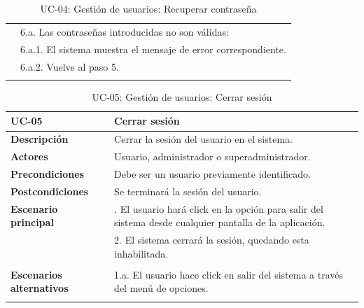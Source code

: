 \begin{table}
\begin{center}
\begin{tabularx}{16.4cm}{|l|X|}
      & 6.a. Las contraseñas introducidas no son válidas:\\
      & \hspace{0.3cm} 6.a.1. El sistema muestra el mensaje de error correspondiente.\\
      & \hspace{0.3cm} 6.a.2. Vuelve al paso 5.\\
      & \\
      \hline
    \end{tabularx}
    \caption{UC-04: Gestión de usuarios: Recuperar contraseña}
    \label{tab:CU-restablecer-contrasena}
  \end{center}
\end{table}


\begin{table}
  \begin{center}
    \begin{tabularx}{16.4cm}{|l|X|}
      \hline
      \textbf{UC-05} & \textbf{Cerrar sesión}\\
      \hline
      \textbf{Descripción} & Cerrar la sesión del usuario en el sistema.\\
      \hline
      \textbf{Actores} & Usuario, administrador o superadministrador.\\
      \hline
      \textbf{Precondiciones} & Debe ser un usuario previamente identificado.\\
      \hline
      \textbf{Postcondiciones} & Se terminará la sesión del usuario.\\
      \hline
      \textbf{Escenario principal} & \smallskip 1. El usuario hará click en la opción para salir del sistema desde cualquier pantalla de la aplicación.\\
      & 2. El sistema cerrará la sesión, quedando esta inhabilitada.\\
      & \\
      \hline
      \textbf{Escenarios alternativos} & \smallskip 1.a. El usuario hace click en salir del sistema a través del menú de opciones.\\
      & \\
      \hline
    \end{tabularx}
    \caption{UC-05: Gestión de usuarios: Cerrar sesión}
    \label{tab:CU-cerrar-sesion}
  \end{center}
\end{table}


